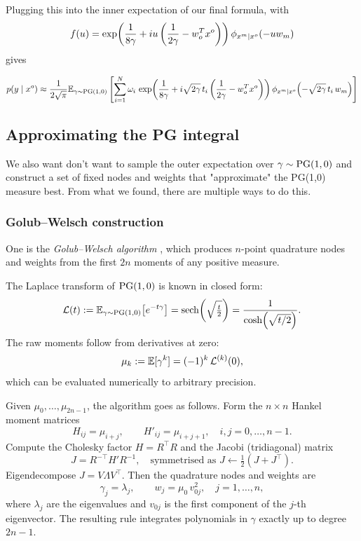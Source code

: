 Plugging this into the inner expectation of our final formula, with\\
\[
  f(u) = \exp \!\left( \frac{1}{8\gamma} + i u \left(\frac{1}{2\gamma} - w_o^T x^o \right) \right) \phi_{x^m \mid x^o}(-u w_m)
\]
gives

\[
  p(y \mid x^o) \approx
  \frac{1}{2\sqrt{\pi}} \mathbb{E}_{\gamma \sim \mathrm{PG}(1,0)} \left[
    \sum_{i=1}^{N} \omega_i \,
    \exp \!\left( \frac{1}{8\gamma} + i \sqrt{2\gamma}\, t_i \left(\frac{1}{2\gamma} - w_o^T x^o \right) \right)
    \phi_{x^m \mid x^o}\!\left(-\sqrt{2\gamma}\, t_i\, w_m\right)
  \right]
\]

\subsection{Approximating the PG integral}
\label{subsec:pg-quadrature}

We also want don't want to sample the outer expectation over $\gamma \sim \mathrm{PG}(1,0)$ and 
construct a set of fixed nodes and weights that "approximate" the PG(1,0) measure best.
From what we found, there are multiple ways to do this.

\subsubsection{Golub--Welsch construction}
One is the \emph{Golub--Welsch algorithm}
\cite{golubwelsch1969}, which produces $n$-point quadrature nodes and weights
from the first $2n$ moments of any positive measure.

The Laplace transform of $\mathrm{PG}(1,0)$ is known in closed form:
\[
  \mathcal{L}(t)
  := \mathbb{E}_{\gamma \sim \mathrm{PG}(1,0)}\!\left[e^{-t\gamma}\right]
  = \operatorname{sech}\!\left(\sqrt{\tfrac{t}{2}}\right)
  = \frac{1}{\cosh\!\left(\sqrt{t/2}\right)}.
\]
The raw moments follow from derivatives at zero:
\[
  \mu_k := \mathbb{E}[\gamma^k] = (-1)^k\, \mathcal{L}^{(k)}(0),
\]
which can be evaluated numerically to arbitrary precision.

Given $\mu_0, \dots, \mu_{2n-1}$, the algorithm goes as follows.
Form the $n \times n$ Hankel moment matrices
\[
  H_{ij} = \mu_{i+j}, \qquad H'_{ij} = \mu_{i+j+1}, \quad i,j = 0,\dots,n-1.
\]
Compute the Cholesky factor $H = R^\top R$ and the Jacobi (tridiagonal) matrix
\[
  J = R^{-\top} H' R^{-1}, \quad \text{symmetrised as } J \leftarrow \tfrac{1}{2}(J + J^\top).
\]
Eigendecompose $J = V \Lambda V^\top$.  Then the quadrature nodes and weights are
\[
  \gamma_j = \lambda_j, \qquad w_j = \mu_0\, v_{0j}^2, \quad j = 1,\dots,n,
\]
where $\lambda_j$ are the eigenvalues and $v_{0j}$ is the first component of
the $j$-th eigenvector.  The resulting rule integrates polynomials in $\gamma$
exactly up to degree $2n-1$.

